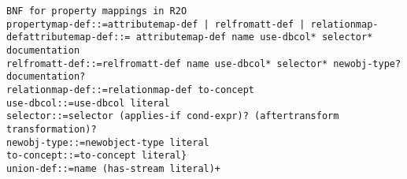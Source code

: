 \documentclass[preprint,5p,twocolumn,12pt]{elsarticle}
\begin{document}
\begin{lstlisting}[style=SNEEqlStyle,language=R2O,label=list:schema,caption=Relational schema of the stream data source.]
BNF for property mappings in R2O
propertymap-def::=attributemap-def | relfromatt-def | relationmap-defattributemap-def::= attributemap-def name use-dbcol* selector* documentation
relfromatt-def::=relfromatt-def name use-dbcol* selector* newobj-type? documentation?
relationmap-def::=relationmap-def to-concept
use-dbcol::=use-dbcol literal
selector::=selector (applies-if cond-expr)? (aftertransform transformation)?
newobj-type::=newobject-type literal
to-concept::=to-concept literal}
union-def::=name (has-stream literal)+
\end{lstlisting}
\end{document}
